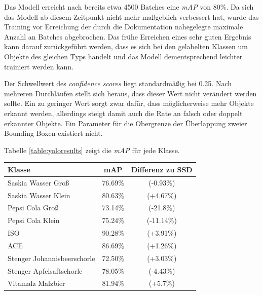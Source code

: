 Das Modell erreicht nach bereits etwa 4500 Batches eine \textit{mAP} von 80\%. Da sich das Modell ab diesem Zeitpunkt nicht mehr maßgeblich verbessert hat, wurde das Training vor Erreichung der durch die Dokumentation nahegelegte maximale Anzahl an Batches abgebrochen. Das frühe Erreichen eines sehr guten Ergebnis kann darauf zurückgeführt werden, dass es sich bei den gelabelten Klassen um Objekte des gleichen Typs handelt und das Modell dementsprechend leichter trainiert werden kann. 

Der Schwellwert des \textit{confidence scores} liegt standardmäßig bei 0.25. Nach mehreren Durchläufen stellt sich heraus, dass dieser Wert nicht verändert werden sollte. Ein zu geringer Wert sorgt zwar dafür, dass möglicherweise mehr Objekte erkannt werden, allerdings steigt damit auch die Rate an falsch oder doppelt erkannter Objekte. Ein Parameter für die Obergrenze der Überlappung zweier Bounding Boxen existiert nicht.

Tabelle \ref{table:yoloresults} zeigt die \textit{mAP} für jede Klasse.

\begin{center}
	\begin{tabular}[H]{l|c|c}
		Klasse & mAP & Differenz zu SSD\\
		\hline
		Saskia Wasser Groß & 76.69\% & (-0.93\%) \\
		Saskia Wasser Klein & 80.63\% & (+4.67\%) \\
		Pepsi Cola Groß & 73.14\% & (-21.8\%) \\
		Pepsi Cola Klein & 75.24\% & (-11.14\%) \\
		ISO & 90.28\% & (+3.91\%) \\
		ACE & 86.69\% & (+1.26\%) \\
		Stenger Johannisbeerschorle & 72.50\% & (+3.03\%) \\
		Stenger Apfelsaftschorle & 78.05\% & (-4.43\%) \\
		Vitamalz Malzbier & 81.94\% & (+5.7\%)
	\end{tabular}
	\label{table:yoloresults}
\end{center}

